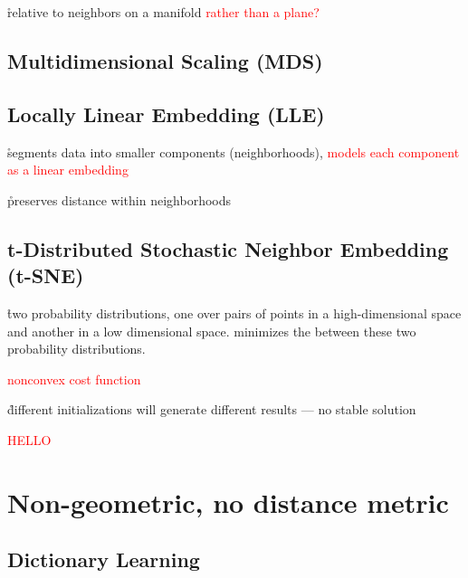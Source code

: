 
\r{relative to neighbors on a manifold \textcolor{red}{rather than a plane?}}

\subsection{Multidimensional Scaling (MDS)}


\subsection{Locally Linear Embedding (LLE)}

\r{segments data into smaller components (neighborhoods), \textcolor{red}{models each component as a linear embedding}}

\r{preserves distance within neighborhoods}


\subsection{t-Distributed Stochastic Neighbor Embedding (t-SNE)}




\r{two probability distributions, one over pairs of points in a high-dimensional space and another in a low dimensional space. minimizes the  between these two probability distributions.}


\textcolor{red}{nonconvex cost function}

\r{different initializations will generate different results --- no stable solution}

\textcolor{red}{HELLO}

\section{Non-geometric, no distance metric}

\subsection{Dictionary Learning}


